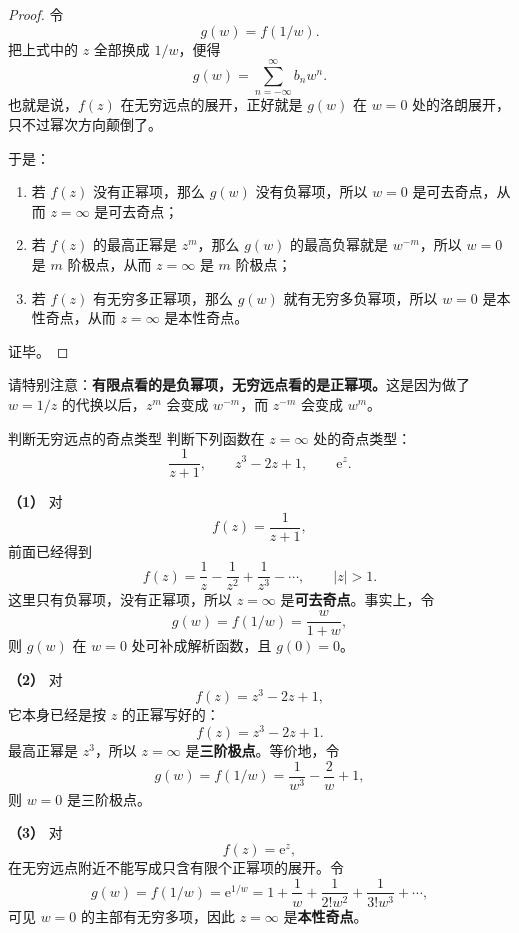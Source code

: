 \begin{proof}
令
\[
    g(w)=f(1/w).
\]
把上式中的 $z$ 全部换成 $1/w$，便得
\[
    g(w)=\sum_{n=-\infty}^{\infty} b_n w^n.
\]
也就是说，$f(z)$ 在无穷远点的展开，正好就是 $g(w)$ 在 $w=0$ 处的洛朗展开，只不过幂次方向颠倒了。

于是：
\begin{enumerate}
    \item 若 $f(z)$ 没有正幂项，那么 $g(w)$ 没有负幂项，所以 $w=0$ 是可去奇点，从而 $z=\infty$ 是可去奇点；
    \item 若 $f(z)$ 的最高正幂是 $z^m$，那么 $g(w)$ 的最高负幂就是 $w^{-m}$，所以 $w=0$ 是 $m$ 阶极点，从而 $z=\infty$ 是 $m$ 阶极点；
    \item 若 $f(z)$ 有无穷多正幂项，那么 $g(w)$ 就有无穷多负幂项，所以 $w=0$ 是本性奇点，从而 $z=\infty$ 是本性奇点。
\end{enumerate}
证毕。
\end{proof}

\begin{zhu}{}{}
请特别注意：\textbf{有限点看的是负幂项，无穷远点看的是正幂项。}这是因为做了 $w=1/z$ 的代换以后，$z^m$ 会变成 $w^{-m}$，而 $z^{-m}$ 会变成 $w^m$。
\end{zhu}

\begin{lizi}{判断无穷远点的奇点类型}{}
判断下列函数在 $z=\infty$ 处的奇点类型：
\[
    \frac{1}{z+1},\qquad z^3-2z+1,\qquad \mathrm{e}^z.
\]

\begin{jie}
\textbf{（1）} 对
\[
    f(z)=\frac{1}{z+1},
\]
前面已经得到
\[
    f(z)=\frac{1}{z}-\frac{1}{z^2}+\frac{1}{z^3}-\cdots,\qquad |z|>1.
\]
这里只有负幂项，没有正幂项，所以 $z=\infty$ 是\textbf{可去奇点}。事实上，令
\[
    g(w)=f(1/w)=\frac{w}{1+w},
\]
则 $g(w)$ 在 $w=0$ 处可补成解析函数，且 $g(0)=0$。

\textbf{（2）} 对
\[
    f(z)=z^3-2z+1,
\]
它本身已经是按 $z$ 的正幂写好的：
\[
    f(z)=z^3-2z+1.
\]
最高正幂是 $z^3$，所以 $z=\infty$ 是\textbf{三阶极点}。等价地，令
\[
    g(w)=f(1/w)=\frac{1}{w^3}-\frac{2}{w}+1,
\]
则 $w=0$ 是三阶极点。

\textbf{（3）} 对
\[
    f(z)=\mathrm{e}^z,
\]
在无穷远点附近不能写成只含有限个正幂项的展开。令
\[
    g(w)=f(1/w)=\mathrm{e}^{1/w}
    = 1+\frac{1}{w}+\frac{1}{2!w^2}+\frac{1}{3!w^3}+\cdots,
\]
可见 $w=0$ 的主部有无穷多项，因此 $z=\infty$ 是\textbf{本性奇点}。
\end{jie}
\end{lizi}


